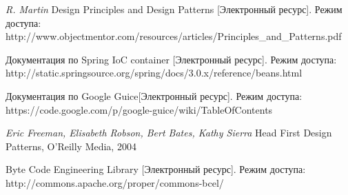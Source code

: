 \begin{thebibliography}{99}

\begin{flushleft}
\textsl{R. Martin} Design Principles and Design Patterns [Электронный ресурс]. Режим доступа: http://www.objectmentor.com/resources/articles/Principles\_and\_Patterns.pdf
\end{flushleft}

\begin{flushleft}
\textsl{} Документация по Spring IoC container [Электронный ресурс]. Режим доступа: http://static.springsource.org/spring/docs/3.0.x/reference/beans.html
\end{flushleft}

\begin{flushleft}
\textsl{} Документация по Google Guice[Электронный ресурс]. Режим доступа: https://code.google.com/p/google-guice/wiki/TableOfContents
\end{flushleft}

\begin{flushleft}
\textsl{Eric Freeman, Elisabeth Robson, Bert Bates, Kathy Sierra} Head First Design Patterns, O'Reilly Media, 2004
\end{flushleft}

\begin{flushleft}
\textsl{} Byte Code Engineering Library [Электронный ресурс]. Режим доступа: http://commons.apache.org/proper/commons-bcel/
\end{flushleft}

\end{thebibliography}